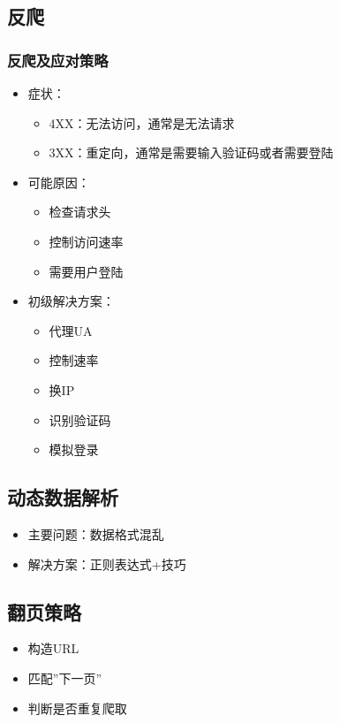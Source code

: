 \documentclass{beamer}
\begin{document}
\subsection{反爬}
\begin{frame}[allowframebreaks]
\frametitle{反爬及应对策略}
\begin{itemize}
  \item 症状：
  \begin{itemize}
    \item 4XX：无法访问，通常是无法请求
    \item 3XX：重定向，通常是需要输入验证码或者需要登陆
  \end{itemize}
  \item 可能原因：
  \begin{itemize}
    \item 检查请求头
    \item 控制访问速率
    \item 需要用户登陆
  \end{itemize}
  \framebreak
  \item 初级解决方案：
  \begin{itemize}
    \item 代理UA
    \item 控制速率
    \item 换IP
    \item 识别验证码
    \item 模拟登录
  \end{itemize}
\end{itemize}
\end{frame}

\subsection{动态数据解析}
\begin{itemize}
  \item 主要问题：数据格式混乱
  \item 解决方案：正则表达式+技巧
\end{itemize}

\subsection{翻页策略}
\begin{itemize}
  \item 构造URL
  \item 匹配''下一页''
  \item 判断是否重复爬取
\end{itemize}
\end{document}
